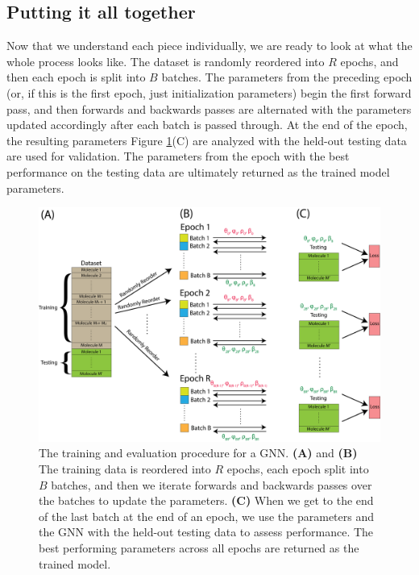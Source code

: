 \subsection{Putting it all together}

Now that we understand each piece individually, we are ready to look at what the whole process looks like. The dataset is randomly reordered into $R$ epochs, and then each epoch is split into $B$ batches. The parameters from the preceding epoch (or, if this is the first epoch, just initialization parameters) begin the first forward pass, and then forwards and backwards passes are alternated with the parameters updated accordingly after each batch is passed through. At the end of the epoch, the resulting parameters Figure \ref{fig:next:gnn:full_process}(C) are analyzed with the held-out testing data are used for validation. The parameters from the epoch with the best performance on the testing data are ultimately returned as the trained model parameters.

\begin{figure}
    \centering
    \includegraphics[width=\linewidth]{next/Images/full_process.png}
    \caption[Process of fitting and testing a GNN]{
The training and evaluation procedure for a GNN. \textbf{(A)} and \textbf{(B)} The training data is reordered into $R$ epochs, each epoch split into $B$ batches, and then we iterate forwards and backwards passes over the batches to update the parameters. \textbf{(C)} When we get to the end of the last batch at the end of an epoch, we use the parameters and the GNN with the held-out testing data to assess performance. The best performing parameters across all epochs are returned as the trained model.}
    \label{fig:next:gnn:full_process}
\end{figure}


